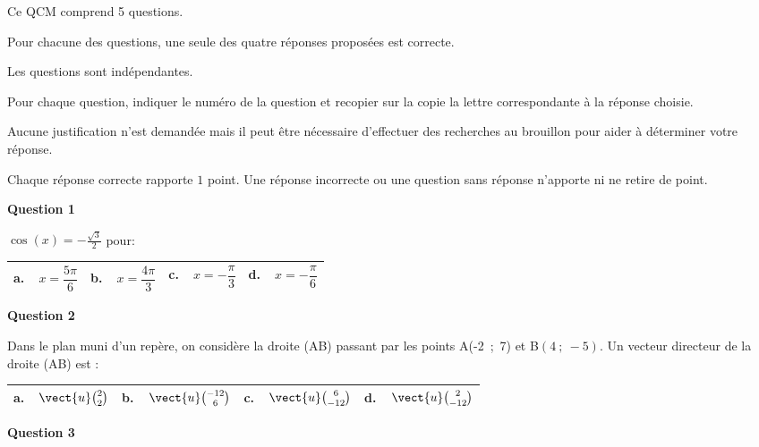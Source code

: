 \medskip

Ce QCM comprend 5 questions.

Pour chacune des questions, une seule des quatre réponses proposées est correcte.

Les questions sont indépendantes.

Pour chaque question, indiquer le numéro de la question et recopier sur la copie la lettre correspondante à la réponse choisie.

Aucune justification n'est demandée mais il peut être nécessaire d'effectuer des recherches au brouillon pour aider à déterminer votre réponse.

Chaque réponse correcte rapporte $1$ point. Une réponse incorrecte ou une question sans réponse n'apporte ni ne retire de point.

\medskip

\textbf{Question 1}

\medskip

$\cos(x)  = - \frac{\sqrt{3}}{2}$ pour:

\begin{center}
\begin{tabularx}{\linewidth}{|*{4}{X|}}\hline
\textbf{a.~~}$x = \dfrac{5\pi}{6}$ &\textbf{b.~~}$x = \dfrac{4\pi}{3}$&\textbf{c.~~}$x = -\dfrac{\pi}{3}$&\textbf{d.~~}$x = - \dfrac{\pi}{6}$\rule[-3mm]{0mm}{9mm}\\ \hline
\end{tabularx}
\end{center}

\medskip

\textbf{Question 2}

\medskip

Dans le plan muni d'un repère, on considère la droite (AB) passant par les points
A(-2~;~7) et B$(4~;~-5)$. Un vecteur directeur de la droite (AB) est :

\begin{center}
\begin{tabularx}{\linewidth}{|*{4}{X|}}\hline
\textbf{a.~~}$\vect{u}\binom{2}{2}$ &\textbf{b.~~}$\vect{u}\binom{-12}{6}$&\textbf{c.~~}$\vect{u}\binom{6}{-12}$&\textbf{d.~~}$\vect{u}\binom{2}{-12}$\rule[-3mm]{0mm}{9mm}\\ \hline
\end{tabularx}
\end{center}

\medskip

\textbf{Question 3}

\medskip

